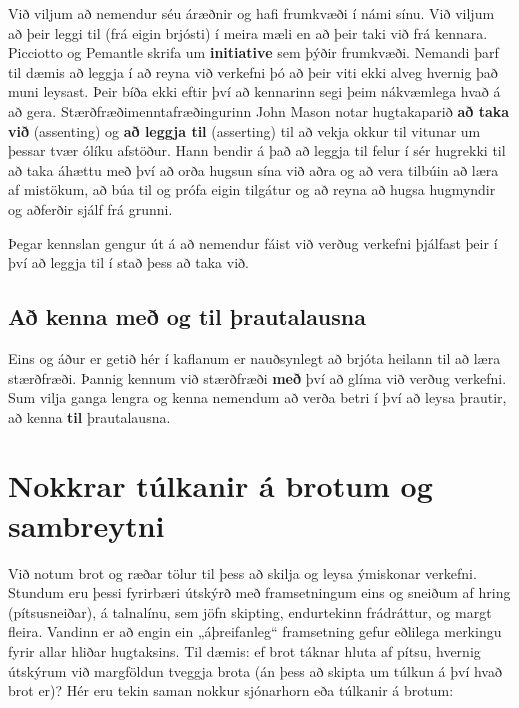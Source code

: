 \documentclass[
  icelandic,
]{book}
\theoremstyle{definition}
\theoremstyle{definition}
\theoremstyle{definition}
\theoremstyle{definition}
\theoremstyle{remark}
\begin{document}
Við viljum að nemendur séu áræðnir og hafi frumkvæði í námi sínu. Við viljum að þeir leggi til (frá eigin brjósti) í meira mæli en að þeir taki við frá kennara. Picciotto og Pemantle skrifa um \textbf{initiative} sem þýðir frumkvæði. Nemandi þarf til dæmis að leggja í að reyna við verkefni þó að þeir viti ekki alveg hvernig það muni leysast. Þeir bíða ekki eftir því að kennarinn segi þeim nákvæmlega hvað á að gera. Stærðfræðimenntafræðingurinn John Mason notar hugtakaparið \textbf{að taka við} (assenting) og \textbf{að leggja til} (asserting) til að vekja okkur til vitunar um þessar tvær ólíku afstöður. Hann bendir á það að leggja til felur í sér hugrekki til að taka áhættu með því að orða hugsun sína við aðra og að vera tilbúin að læra af mistökum, að búa til og prófa eigin tilgátur og að reyna að hugsa hugmyndir og aðferðir sjálf frá grunni.

Þegar kennslan gengur út á að nemendur fáist við verðug verkefni þjálfast þeir í því að leggja til í stað þess að taka við.

\section{Að kenna með og til þrautalausna}\label{auxf0-kenna-meuxf0-og-til-uxferautalausna}

Eins og áður er getið hér í kaflanum er nauðsynlegt að brjóta heilann til að læra stærðfræði. Þannig kennum við stærðfræði \textbf{með} því að glíma við verðug verkefni. Sum vilja ganga lengra og kenna nemendum að verða betri í því að leysa þrautir, að kenna \textbf{til} þrautalausna.

\chapter{Nokkrar túlkanir á brotum og sambreytni}\label{brot-hlutfoll}

Við notum brot og ræðar tölur til þess að skilja og leysa ýmiskonar verkefni. Stundum eru þessi fyrirbæri útskýrð með framsetningum eins og sneiðum af hring (pítsusneiðar), á talnalínu, sem jöfn skipting, endurtekinn frádráttur, og margt fleira. Vandinn er að engin ein „áþreifanleg`` framsetning gefur eðlilega merkingu fyrir allar hliðar hugtaksins. Til dæmis: ef brot táknar hluta af pítsu, hvernig útskýrum við margföldun tveggja brota (án þess að skipta um túlkun á því hvað brot er)?
Hér eru tekin saman nokkur sjónarhorn eða túlkanir á brotum:
\end{document}
